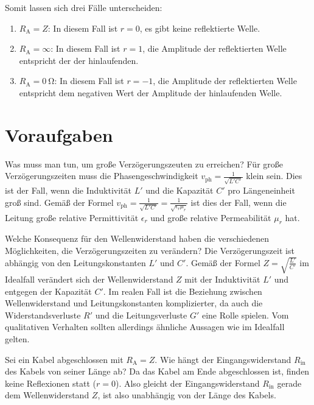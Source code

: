 \documentclass[ngerman]{scrartcl}
\theoremstyle{definition}
\begin{document}
		Somit lassen sich drei Fälle unterscheiden:
		\begin{enumerate}
			\item $R_\mathrm{A} = Z$: In diesem Fall ist $r=0$, es gibt keine reflektierte Welle.
			\item $R_\mathrm{A} = \infty$: In diesem Fall ist $r=1$, die Amplitude der reflektierten Welle entspricht der der hinlaufenden.
			\item $R_\mathrm{A} = \SI{0}{\ohm}$: In diesem Fall ist $r=-1$, die Amplitude der reflektierten Welle entspricht dem negativen Wert der Amplitude der hinlaufenden Welle.
		\end{enumerate}
\clearpage
		

	\section{Voraufgaben}
		\begin{voraufgabe}{Was muss man tun, um große Verzögerungszeuten zu erreichen?}
			Für große Verzögerungszeiten muss die Phasengeschwindigkeit $v_\mathrm{ph} = \frac{1}{\sqrt{L'C'}}$ klein sein. Dies ist der Fall, wenn die Induktivität $L'$ und die Kapazität $C'$ pro Längeneinheit groß sind. Gemäß der Formel $v_\mathrm{ph} = \frac{1}{\sqrt{L'C'}} = \frac{1}{\sqrt{\epsilon_r \mu_r}}$ ist dies der Fall, wenn die Leitung große relative Permittivität $\epsilon_r$ und große relative Permeabilität $\mu_r$ hat.
		\end{voraufgabe}
		\begin{voraufgabe}{Welche Konsequenz für den Wellenwiderstand haben die verschiedenen Möglichkeiten, die Verzögerungszeiten zu verändern?}
			Die Verzögerungszeit ist abhängig von den Leitungskonstanten $L'$ und $C'$. Gemäß der Formel $Z = \sqrt{\frac{L'}{C'}}$ im Idealfall verändert sich der Wellenwiderstand $Z$ mit der Induktivität $L'$ und entgegen der Kapazität $C'$. Im realen Fall ist die Beziehung zwischen Wellenwiderstand und Leitungskonstanten komplizierter, da auch die Widerstandsverluste $R'$ und die Leitungsverluste $G'$ eine Rolle spielen. Vom qualitativen Verhalten sollten allerdings ähnliche Aussagen wie im Idealfall gelten.
		\end{voraufgabe}
		\begin{voraufgabe}{Sei ein Kabel abgeschlossen mit $R_\mathrm{A} = Z$. Wie hängt der Eingangswiderstand $R_\mathrm{in}$ des Kabels von seiner Länge ab?}
			Da das Kabel am Ende abgeschlossen ist, finden keine Reflexionen statt ($r=0$). Also gleicht der Eingangswiderstand $R_\mathrm{in}$ gerade dem Wellenwiderstand $Z$, ist also unabhängig von der Länge des Kabels. 
		\end{voraufgabe}
\end{document}
